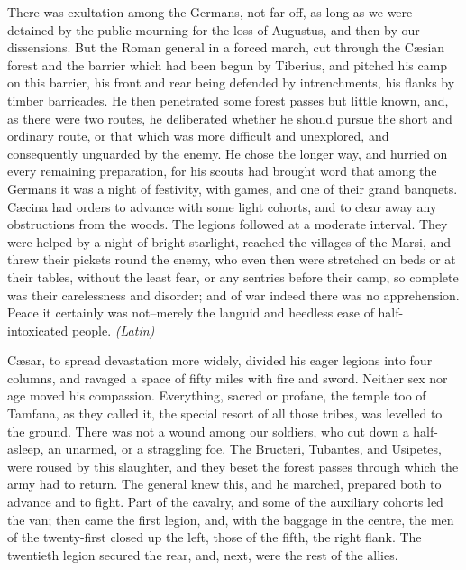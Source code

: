 
There was exultation among the Germans, not far off, as long as we were detained by the public mourning for the loss of Augustus, and then by our dissensions. But the Roman general in a forced march, cut through the Cæsian forest and the barrier which had been begun by Tiberius, and pitched his camp on this barrier, his front and rear being defended by intrenchments, his flanks by timber barricades. He then penetrated some forest passes but little known, and, as there were two routes, he deliberated whether he should pursue the short and ordinary route, or that which was more difficult and unexplored, and consequently unguarded by the enemy. He chose the longer way, and hurried on every remaining preparation, for his scouts had brought word that among the Germans it was a night of festivity, with games, and one of their grand banquets. Cæcina had orders to advance with some light cohorts, and to clear away any obstructions from the woods. The legions followed at a moderate interval. They were helped by a night of bright starlight, reached the villages of the Marsi, and threw their pickets round the enemy, who even then were stretched on beds or at their tables, without the least fear, or any sentries before their camp, so complete was their carelessness and disorder; and of war indeed there was no apprehension. Peace it certainly was not--merely the languid and heedless ease of half-intoxicated people. \emph{(Latin)}


Cæsar, to spread devastation more widely, divided his eager legions into four columns, and ravaged a space of fifty miles with fire and sword. Neither sex nor age moved his compassion. Everything, sacred or profane, the temple too of Tamfana, as they called it, the special resort of all those tribes, was levelled to the ground. There was not a wound among our soldiers, who cut down a half-asleep, an unarmed, or a straggling foe. The Bructeri, Tubantes, and Usipetes, were roused by this slaughter, and they beset the forest passes through which the army had to return. The general knew this, and he marched, prepared both to advance and to fight. Part of the cavalry, and some of the auxiliary cohorts led the van; then came the first legion, and, with the baggage in the centre, the men of the twenty-first closed up the left, those of the fifth, the right flank. The twentieth legion secured the rear, and, next, were the rest of the allies.

